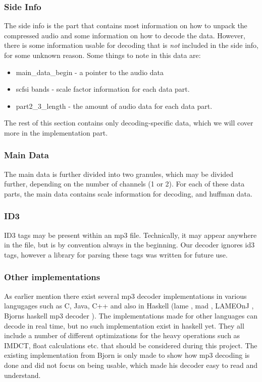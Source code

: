 \documentclass[a4paper,12pt]{article}
\begin{document}
       \subsubsection{Side Info}
            The side info is the part that contains most information on how to
            unpack the compressed audio and some information on how to decode
            the data. However, there is some information usable for decoding
            that is \textit{not} included in the side info, for some unknown
            reason. Some things to note in this data are:
            \begin{itemize}
                \item main\_data\_begin - a pointer to the audio data
                \item scfsi bands - scale factor information for each data part.
                \item part2\_3\_length - the amount of audio data for each
                      data part.
            \end{itemize}
            The rest of this section contains only decoding-specific data, which
            we will cover more in the implementation part.

       \subsubsection{Main Data}
            The main data is further divided into two granules, which may be
            divided further, depending on the number of channels (1 or 2). For
            each of these data parts, the main data contains scale information
            for decoding, and huffman data.

        \subsubsection{ID3}
            ID3 tags may be present within an mp3 file. Technically, it may
            appear anywhere in the file, but is by convention always in the
            beginning. Our decoder ignores id3 tags, however a library for
            parsing these tags was written for future use.

       \subsubsection{Other implementations}
           As earlier mention there exist several mp3 decoder
           implementations in various langugages such as C, Java, C++
           and also in Haskell (lame \cite{lame}, mad \cite{mad},
           LAMEOnJ \cite{lameonj}, Bjorns haskell mp3
           decoder \cite{bjorn}). The implementations made for other languages can
           decode in real time, but no such implementation exist in
           haskell yet. They all include a number of different
           optimizations for the heavy operations such as IMDCT,
           float calculations etc. that should be considered during
           this project. The existing implementation from Bjorn is
           only made to show how mp3 decoding is done and did not
           focus on being usable, which made his decoder easy to read
           and understand.
\end{document}
